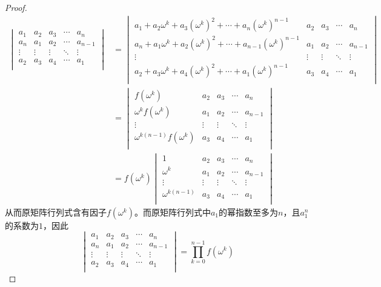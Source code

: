 \documentclass[lang = cn, scheme = chinese, thmcnt = section]{elegantbook}
\begin{document}
\begin{proof}
	\begin{align*}
		\begin{vmatrix}
			a_1 & a_2 & a_3 & \cdots & a_n\\
			a_n & a_1 & a_2 & \cdots & a_{n-1}\\
			\vdots & \vdots & \vdots & \ddots& \vdots\\
			a_2 & a_3 & a_4 & \cdots & a_1\\
		\end{vmatrix}
		& = \begin{vmatrix}
			a_1+a_2\omega^k+a_3(\omega^k)^2+\cdots+a_n(\omega^k)^{n-1} & a_2 & a_3 & \cdots & a_n\\
			a_n+a_1\omega^k+a_2(\omega^k)^2+\cdots+a_{n-1}(\omega^k)^{n-1} & a_1 & a_2 & \cdots & a_{n-1}\\
			\vdots & \vdots & \vdots & \ddots& \vdots\\
			a_2+a_3\omega^k+a_4(\omega^k)^2+\cdots+a_1(\omega^k)^{n-1} & a_3 & a_4 & \cdots & a_1\\
		\end{vmatrix}\\
		& = \begin{vmatrix}
			f(\omega^k) & a_2 & a_3 & \cdots & a_n\\
			\omega^k f(\omega^k) & a_1 & a_2 & \cdots & a_{n-1}\\
			\vdots & \vdots & \vdots & \ddots& \vdots\\
			\omega^{k(n-1)}f(\omega^k) & a_3 & a_4 & \cdots & a_1\\
		\end{vmatrix}\\
		& = f(\omega^k)
		\begin{vmatrix}
			1 & a_2 & a_3 & \cdots & a_n\\
			\omega^k & a_1 & a_2 & \cdots & a_{n-1}\\
			\vdots & \vdots & \vdots & \ddots& \vdots\\
			\omega^{k(n-1)} & a_3 & a_4 & \cdots & a_1\\
		\end{vmatrix}
	\end{align*}
	从而原矩阵行列式含有因子$f(\omega^k)$。而原矩阵行列式中$a_1$的幂指数至多为$n$，且$a_1^n$的系数为$1$，因此
	$$
	\begin{vmatrix}
		a_1 & a_2 & a_3 & \cdots & a_n\\
		a_n & a_1 & a_2 & \cdots & a_{n-1}\\
		\vdots & \vdots & \vdots & \ddots& \vdots\\
		a_2 & a_3 & a_4 & \cdots & a_1\\
	\end{vmatrix}
	=\prod_{k=0}^{n-1}f(\omega^k)
	$$
\end{proof}
\end{document}
